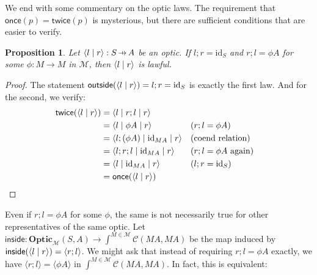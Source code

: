 \documentclass[11pt,letterpaper]{article}
\theoremstyle{plain}
\newtheorem{proposition}[theorem]{Proposition}
\theoremstyle{definition}
\newcommand{\C}{\mathscr{C}}
\newcommand{\M}{\mathscr{M}}
\newcommand{\Optic}{\mathbf{Optic}}
\newcommand{\id}{\mathrm{id}}
\newcommand{\rep}[2]{{\ensuremath \left\langle #1 \mid #2 \right\rangle}}
\newcommand{\repthree}[3]{{\ensuremath \langle #1 \mid #2 \mid #3 \rangle}}
\newcommand{\inside}{\mathsf{inside}}
\newcommand{\outside}{\mathsf{outside}}
\newcommand{\once}{\mathsf{once}}
\newcommand{\twice}{\mathsf{twice}}
\newcommand{\hto}{\ensuremath{\,\mathaccent\shortmid\rightarrow\,}}
\begin{document}
We end with some commentary on the optic laws. The requirement that $\once(p) = \twice(p)$ is mysterious, but there are sufficient conditions that are easier to verify.

\begin{proposition}
  Let $\rep{l}{r} : S \hto A$ be an optic. If $l;r = \id_S$ and $r;l = \phi A$ for some $\phi : M \to M$ in $\M$, then $\rep{l}{r}$ is lawful.
\end{proposition}
\begin{proof}
  The statement $\outside(\rep{l}{r}) = l;r = \id_S$ is exactly the first law. And for the second, we verify:
  \begin{align*}
    \twice(\rep{l}{r})
    &= \repthree{l}{r;l}{r} \\
    &= \repthree{l}{\phi A}{r} && \text{($r;l = \phi A$)}\\
    &= \repthree{l ; (\phi A)}{\id_{MA}}{r} && \text{(coend relation)} \\
    &= \repthree{l;r;l}{\id_{MA}}{r} && \text{($r;l = \phi A$ again)}\\
    &= \repthree{l}{\id_{MA}}{r}  && \text{($l;r = \id_S$)}\\
    &= \once(\rep{l}{r})
  \end{align*}
\end{proof}

Even if $r;l = \phi A$ for some $\phi$, the same is not necessarily true for other representatives of the same optic. Let $\inside : \Optic_\M(S, A) \to \int^{M \in \M} \C(M A, M A)$ be the map induced by $\inside(\rep{l}{r}) = \langle r ; l \rangle$. We might ask that instead of requiring $r;l = \phi A$ exactly, we have $\langle r ; l \rangle = \langle \phi A \rangle$ in $\int^{M \in \M} \C(M A, M A)$. In fact, this is equivalent:
\end{document}
